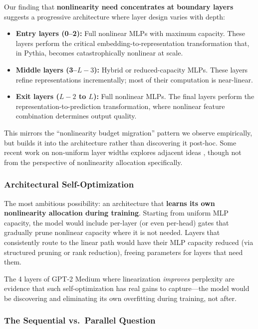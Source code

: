 \documentclass[11pt]{article}
\begin{document}
Our finding that \textbf{nonlinearity need concentrates at boundary layers} suggests a progressive architecture where layer design varies with depth:
\begin{itemize}
    \item \textbf{Entry layers (0--2):} Full nonlinear MLPs with maximum capacity. These layers perform the critical embedding-to-representation transformation that, in Pythia, becomes catastrophically nonlinear at scale.
    \item \textbf{Middle layers (3--$L{-}3$):} Hybrid or reduced-capacity MLPs. These layers refine representations incrementally; most of their computation is near-linear.
    \item \textbf{Exit layers ($L{-}2$ to $L$):} Full nonlinear MLPs. The final layers perform the representation-to-prediction transformation, where nonlinear feature combination determines output quality.
\end{itemize}

\noindent This mirrors the ``nonlinearity budget migration'' pattern we observe empirically, but builds it into the architecture rather than discovering it post-hoc. Some recent work on non-uniform layer widths explores adjacent ideas \citep{he2024}, though not from the perspective of nonlinearity allocation specifically.

\subsubsection{Architectural Self-Optimization}

The most ambitious possibility: an architecture that \textbf{learns its own nonlinearity allocation during training}. Starting from uniform MLP capacity, the model would include per-layer (or even per-head) gates that gradually prune nonlinear capacity where it is not needed. Layers that consistently route to the linear path would have their MLP capacity reduced (via structured pruning or rank reduction), freeing parameters for layers that need them.

The 4 layers of GPT-2 Medium where linearization \textit{improves} perplexity are evidence that such self-optimization has real gains to capture---the model would be discovering and eliminating its own overfitting during training, not after.

\subsubsection{The Sequential vs.\ Parallel Question}
\end{document}
